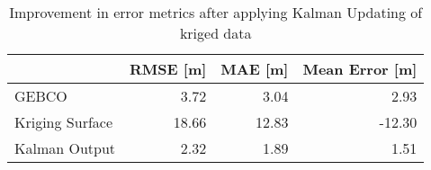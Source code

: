 \begin{table}
\centering
\caption{Improvement in error metrics after applying Kalman Updating of kriged data}
\label{tab:oahu1_gebco_raster_error}
\begin{tabular}{lrrr}
\toprule
 & RMSE [m] & MAE [m] & Mean Error [m] \\
\midrule
GEBCO & 3.72 & 3.04 & 2.93 \\
Kriging Surface & 18.66 & 12.83 & -12.30 \\
Kalman Output & 2.32 & 1.89 & 1.51 \\
\bottomrule
\end{tabular}
\end{table}
